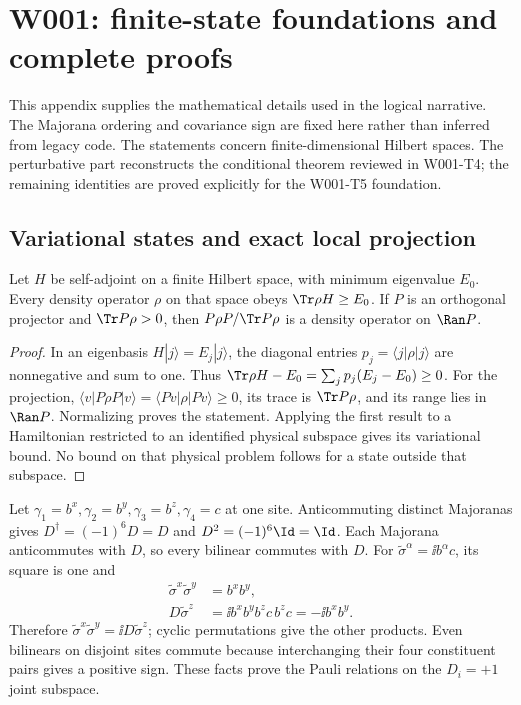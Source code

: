\chapter{W001: finite-state foundations and complete proofs}
\label{app:finite_foundations}

This appendix supplies the mathematical details used in the logical narrative.
The Majorana ordering and covariance sign are fixed here rather than inferred
from legacy code. The statements concern finite-dimensional Hilbert spaces.
The perturbative part reconstructs the conditional theorem reviewed in W001-T4;
the remaining identities are proved explicitly for the W001-T5 foundation.

\section{Variational states and exact local projection}
\label{app:projection_proof}
\begin{proposition}
Let $H$ be self-adjoint on a finite Hilbert space, with minimum eigenvalue $E_0$.
Every density operator $\rho$ on that space obeys $\Tr\rho H\geq E_0$.
If $P$ is an orthogonal projector and $\Tr P\rho>0$, then
$P\rho P/\Tr P\rho$ is a density operator on $\Ran P$.
\end{proposition}
\begin{proof}
In an eigenbasis $H|j\rangle=E_j|j\rangle$, the diagonal entries
$p_j=\langle j|\rho|j\rangle$ are nonnegative and sum to one. Thus
$\Tr\rho H-E_0=\sum_jp_j(E_j-E_0)\geq0$. For the projection,
$\langle v|P\rho P|v\rangle=\langle Pv|\rho|Pv\rangle\geq0$,
its trace is $\Tr P\rho$, and its range lies in $\Ran P$.
Normalizing proves the statement. Applying the first result to a Hamiltonian
restricted to an identified physical subspace gives its variational bound.
No bound on that physical problem follows for a state outside that subspace.
\end{proof}

Let $\gamma_1=b^x,\gamma_2=b^y,\gamma_3=b^z,\gamma_4=c$ at one site.
Anticommuting distinct Majoranas gives
$D^\dagger=(-1)^6D=D$ and $D^2=(-1)^6\Id=\Id$.
Each Majorana anticommutes with $D$, so every bilinear commutes with $D$.
For $\widetilde\sigma^\alpha=\ii b^\alpha c$, its square is one and
\begin{align}
 \widetilde\sigma^x\widetilde\sigma^y&=b^xb^y,\\
 D\widetilde\sigma^z&=\ii b^xb^yb^zc\,b^zc=-\ii b^xb^y.
\end{align}
Therefore $\widetilde\sigma^x\widetilde\sigma^y=\ii D\widetilde\sigma^z$;
cyclic permutations give the other products. Even bilinears on disjoint sites
commute because interchanging their four constituent pairs gives a positive
sign. These facts prove the Pauli relations on the $D_i=+1$ joint subspace.

